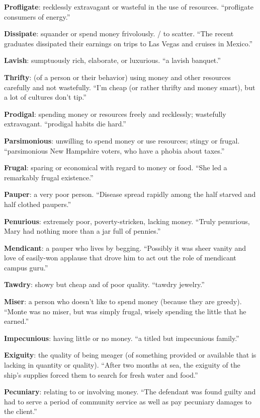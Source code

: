 \documentclass[12pt, a4paper]{ximera}
\begin{document}
\textbf{Profligate}: recklessly extravagant or wasteful in the use of resources. ``profligate consumers of energy.''

\textbf{Dissipate}: squander or spend money frivolously. / to scatter. ``The recent graduates dissipated their earnings on trips to Las Vegas and cruises in Mexico.''

\textbf{Lavish}: sumptuously rich, elaborate, or luxurious. ``a lavish banquet.''

\textbf{Thrifty}: (of a person or their behavior) using money and other resources carefully and not wastefully. ``I'm cheap (or rather thrifty and money smart), but a lot of cultures don't tip.''

\textbf{Prodigal}: spending money or resources freely and recklessly; wastefully extravagant. ``prodigal habits die hard.''

\textbf{Parsimonious}: unwilling to spend money or use resources; stingy or frugal. ``parsimonious New Hampshire voters, who have a phobia about taxes.''

\textbf{Frugal}: sparing or economical with regard to money or food. ``She led a remarkably frugal existence.''

\textbf{Pauper}: a very poor person. ``Disease spread rapidly among the half starved and half clothed paupers.''

\textbf{Penurious}: extremely poor, poverty-stricken, lacking money. ``Truly penurious, Mary had nothing more than a jar full of pennies.''

\textbf{Mendicant}: a pauper who lives by begging. ``Possibly it was sheer vanity and love of easily-won applause that drove him to act out the role of mendicant campus guru.''

\textbf{Tawdry}: showy but cheap and of poor quality. ``tawdry jewelry.''

\textbf{Miser}: a person who doesn't like to spend money (because they are greedy). ``Monte was no miser, but was simply frugal, wisely spending the little that he earned.''

\textbf{Impecunious}: having little or no money. ``a titled but impecunious family.''

\textbf{Exiguity}: the quality of being meager (of something provided or available that is lacking in quantity or quality). ``After two months at sea, the exiguity of the ship's supplies forced them to search for fresh water and food.''

\textbf{Pecuniary}: relating to or involving money. ``The defendant was found guilty and had to serve a period of community service as well as pay pecuniary damages to the client.''
\end{document}
